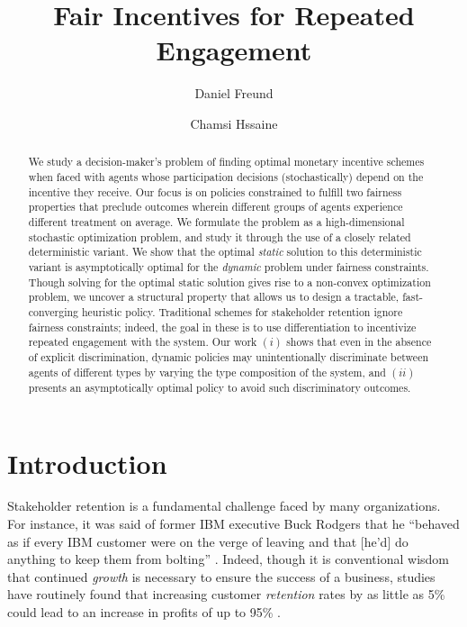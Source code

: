 \documentclass[12pt]{article}
\title{Fair Incentives for Repeated Engagement}
\author{Daniel Freund \and Chamsi Hssaine}
\begin{document}
\maketitle

\begin{abstract}
We study a decision-maker's problem of finding optimal monetary incentive schemes when faced with agents whose participation decisions {(stochastically) depend on the incentive they receive}. Our focus is on policies constrained to fulfill two fairness properties that {preclude outcomes wherein} different groups of agents experience different treatment on average. {We formulate the problem as a high-dimensional stochastic optimization problem, and study it through the use of a closely related deterministic variant.} We show that the optimal \emph{static} solution to this deterministic variant is asymptotically optimal for the {\it dynamic} problem under fairness constraints. Though solving for the optimal static solution gives rise to a non-convex optimization problem, we uncover a structural property that allows us to design a tractable, fast-converging heuristic policy.
Traditional schemes for stakeholder retention ignore fairness constraints; indeed, the goal in these is to use differentiation to incentivize {repeated engagement with the system}. Our work $(i)$ shows that even in the absence of explicit discrimination, {dynamic policies may unintentionally discriminate between agents of different types by varying the type composition of the system}, and $(ii)$ presents an asymptotically optimal policy to avoid such discriminatory outcomes.
\end{abstract}

\newpage

\section{Introduction}\label{sec:intro}


Stakeholder retention is a fundamental challenge faced by many organizations.
For instance, it was said of former IBM executive Buck Rodgers that he ``behaved as if every IBM customer
were on the verge of leaving and that
[he'd] do anything to keep them from
bolting'' \cite{rodgers1986ibm}. Indeed, though it is conventional wisdom that continued {\it growth}  is necessary to ensure the success of a business, studies have routinely found that increasing customer {\it retention} rates by as little as 5\% could lead to an increase in profits of up to 95\% \cite{gallo2014value}. 
\end{document}
